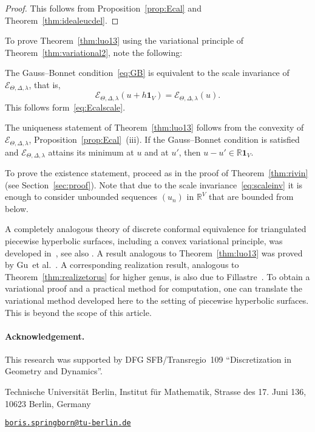 \documentclass[a4paper, 11pt]{article}
\newcommand{\R}{\mathbb{R}}
\newcommand{\Ecal}{\mathcal{E}}
\newcommand{\etal}{{et al.}}
\theoremstyle{plain}
\theoremstyle{definition}
\begin{document}
\begin{proof}
  This follows from Proposition~\ref{prop:Ecal} and Theorem~\ref{thm:idealeucdel}.  
\end{proof}

To prove Theorem~\ref{thm:luo13} using the variational principle of
Theorem~\ref{thm:variational2}, note the following:

\medskip
\begin{compactitem}
\item The Gauss--Bonnet condition~\eqref{eq:GB} is equivalent to the
  scale invariance of $\Ecal_{\Theta,\Delta,\lambda}$, that is,
  \begin{equation}
    \label{eq:scaleinv}
    \Ecal_{\Theta,\Delta,\lambda}(u+h \mathbf{1}_{V})=\Ecal_{\Theta,\Delta,\lambda}(u).
  \end{equation}
  This follows form~\eqref{eq:Ecalscale}.
\item The uniqueness statement of Theorem~\ref{thm:luo13} follows from
  the convexity of $\Ecal_{\Theta,\Delta,\lambda}$,
  Proposition~\ref{prop:Ecal}~(iii). If the Gauss--Bonnet condition is
  satisfied and $\Ecal_{\Theta,\Delta,\lambda}$ attains its minimum at
  $u$ and at $u'$, then $u-u'\in\R\mathbf{1}_{V}$. 
\item To prove the existence statement, proceed as in the proof of
  Theorem~\ref{thm:rivin} (see Section~\ref{sec:proof}). Note that due to
  the scale invariance~\eqref{eq:scaleinv} it is enough to consider
  unbounded sequences $(u_{n})$ in $\R^{V}$ that are bounded from below.
\end{compactitem}

\medskip%
A completely analogous theory of discrete conformal equivalence for
triangulated piecewise hyperbolic surfaces, including a convex
variational principle, was developed in~\cite[Sec.~6]{bobenko15}, see
also \cite{bobenko16}. A result analogous to Theorem~\ref{thm:luo13}
was proved by Gu~\etal~\cite{luo14}. A corresponding realization
result, analogous to Theorem~\ref{thm:realizetorus} for higher genus,
is also due to Fillastre~\cite[Theorem B$'$]{fillastre08}. To obtain a
variational proof and a practical method for computation, one can
translate the variational method developed here to the setting of
piecewise hyperbolic surfaces.  This is beyond the scope of this
article.

\paragraph{Acknowledgement.}
This research was supported by DFG SFB/Trans\-regio~109
``Discretization in Geometry and Dynamics''.

\begingroup
\small


\endgroup

\vspace{3\baselineskip}\noindent%
Technische Universit{\"a}t Berlin,
Institut f{\"u}r Mathematik,
Strasse des 17. Juni 136,
10623 Berlin, Germany

\vspace{\baselineskip}\noindent%
\href{mailto:boris.springborn@tu-berlin.de}{\nolinkurl{boris.springborn@tu-berlin.de}}
\end{document}
